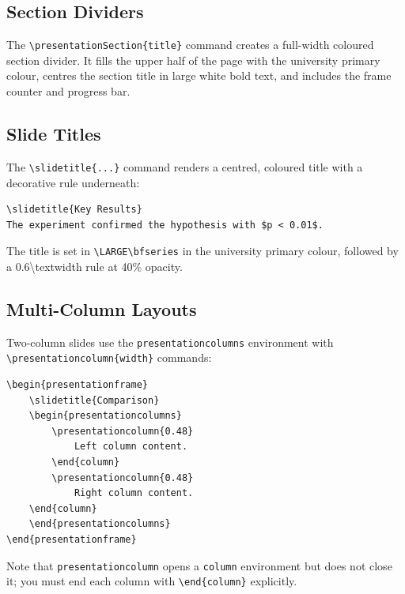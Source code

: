 \subsection{Section Dividers}

The \texttt{\textbackslash presentationSection\{title\}} command creates a
full-width coloured section divider.  It fills the upper half of the page
with the university primary colour, centres the section title in large
white bold text, and includes the frame counter and progress bar.

\subsection{Slide Titles}

The \texttt{\textbackslash slidetitle\{...\}} command renders a centred,
coloured title with a decorative rule underneath:

\begin{verbatim}
\slidetitle{Key Results}
The experiment confirmed the hypothesis with $p < 0.01$.
\end{verbatim}

The title is set in \texttt{\textbackslash LARGE\textbackslash bfseries}
in the university primary colour, followed by a 0.6\textbackslash textwidth
rule at 40\% opacity.

\subsection{Multi-Column Layouts}

Two-column slides use the \texttt{presentationcolumns} environment with
\texttt{\textbackslash presentationcolumn\{width\}} commands:

\begin{verbatim}
\begin{presentationframe}
    \slidetitle{Comparison}
    \begin{presentationcolumns}
        \presentationcolumn{0.48}
            Left column content.
        \end{column}
        \presentationcolumn{0.48}
            Right column content.
    \end{column}
    \end{presentationcolumns}
\end{presentationframe}
\end{verbatim}

Note that \texttt{presentationcolumn} opens a \texttt{column} environment
but does not close it; you must end each column with
\texttt{\textbackslash end\{column\}} explicitly.

